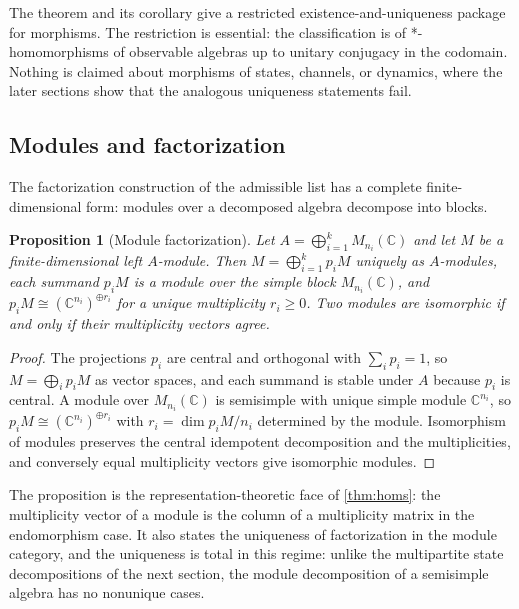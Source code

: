 \documentclass[11pt,letterpaper]{article}
\newtheorem{proposition}[theorem]{Proposition}
\theoremstyle{definition}
\theoremstyle{remark}
\begin{document}
The theorem and its corollary give a restricted existence-and-uniqueness package for morphisms. The restriction is essential: the classification is of *-homomorphisms of observable algebras up to unitary conjugacy in the codomain. Nothing is claimed about morphisms of states, channels, or dynamics, where the later sections show that the analogous uniqueness statements fail.

\subsection{Modules and factorization}

The factorization construction of the admissible list has a complete finite-dimensional form: modules over a decomposed algebra decompose into blocks.

\begin{proposition}[Module factorization]
\label{prop:module-factorization}
Let $A = \bigoplus_{i=1}^{k} M_{n_i}(\mathbb{C})$ and let $M$ be a finite-dimensional left $A$-module. Then $M = \bigoplus_{i=1}^{k} p_i M$ uniquely as $A$-modules, each summand $p_i M$ is a module over the simple block $M_{n_i}(\mathbb{C})$, and $p_i M \cong (\mathbb{C}^{n_i})^{\oplus r_i}$ for a unique multiplicity $r_i \geq 0$. Two modules are isomorphic if and only if their multiplicity vectors agree.
\end{proposition}

\begin{proof}
The projections $p_i$ are central and orthogonal with $\sum_i p_i = 1$, so $M = \bigoplus_i p_i M$ as vector spaces, and each summand is stable under $A$ because $p_i$ is central. A module over $M_{n_i}(\mathbb{C})$ is semisimple with unique simple module $\mathbb{C}^{n_i}$, so $p_i M \cong (\mathbb{C}^{n_i})^{\oplus r_i}$ with $r_i = \dim p_i M / n_i$ determined by the module. Isomorphism of modules preserves the central idempotent decomposition and the multiplicities, and conversely equal multiplicity vectors give isomorphic modules.
\end{proof}

The proposition is the representation-theoretic face of \cref{thm:homs}: the multiplicity vector of a module is the column of a multiplicity matrix in the endomorphism case. It also states the uniqueness of factorization in the module category, and the uniqueness is total in this regime: unlike the multipartite state decompositions of the next section, the module decomposition of a semisimple algebra has no nonunique cases.
\end{document}
